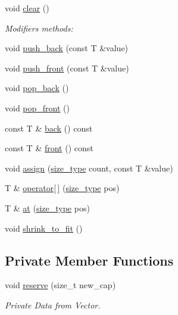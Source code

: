\begin{DoxyCompactItemize}
\item 
void \hyperlink{classsc_1_1vector_a17c6d622cf64278d03feac9c38fa3684}{clear} ()
\begin{DoxyCompactList}\small\item\em Modifiers methods\+: \end{DoxyCompactList}\item 
void \hyperlink{classsc_1_1vector_a5b4a8c72d19d0bdab794e495fb1e334d}{push\+\_\+back} (const T \&value)
\item 
void \hyperlink{classsc_1_1vector_a013daac15aada32590d4372c0cbc610a}{push\+\_\+front} (const T \&value)
\item 
void \hyperlink{classsc_1_1vector_a3dbc8155ac3737f9a9ffe7f454a8f321}{pop\+\_\+back} ()
\item 
void \hyperlink{classsc_1_1vector_aad4717b5827454557f7c9e5c3edd5a7e}{pop\+\_\+front} ()
\item 
const T \& \hyperlink{classsc_1_1vector_a90e25706d3a6e4b72db0f5ad35a63abf}{back} () const
\item 
const T \& \hyperlink{classsc_1_1vector_a85da6164a082030bd04de354d657da0d}{front} () const
\item 
void \hyperlink{classsc_1_1vector_aaa1279dfc147a016a70a65faa7d89c23}{assign} (\hyperlink{classsc_1_1vector_a48bf37ba1a6d0c13504414d86e27c399}{size\+\_\+type} count, const T \&value)
\item 
T \& \hyperlink{classsc_1_1vector_ab93846461528695f38e1d143231b0653}{operator\mbox{[}$\,$\mbox{]}} (\hyperlink{classsc_1_1vector_a48bf37ba1a6d0c13504414d86e27c399}{size\+\_\+type} pos)
\item 
T \& \hyperlink{classsc_1_1vector_ab6fc47c9994c531ff8d0a0b46fe422f8}{at} (\hyperlink{classsc_1_1vector_a48bf37ba1a6d0c13504414d86e27c399}{size\+\_\+type} pos)
\item 
void \hyperlink{classsc_1_1vector_aaeb01dacb26f39fb08cffc6f274284fd}{shrink\+\_\+to\+\_\+fit} ()
\end{DoxyCompactItemize}
\subsection*{Private Member Functions}
\begin{DoxyCompactItemize}
\item 
void \hyperlink{classsc_1_1vector_afd98588509a1f15ce5621735f69b01bf}{reserve} (size\+\_\+t new\+\_\+cap)
\begin{DoxyCompactList}\small\item\em Private Data from Vector. \end{DoxyCompactList}\end{DoxyCompactItemize}
